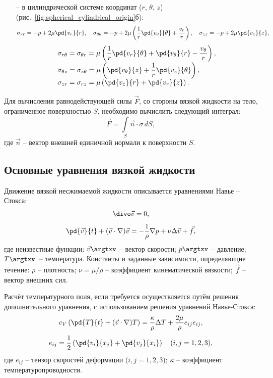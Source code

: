 \documentclass[a4paper, 14pt]{extarticle}
\begin{document}
\begin{itemize}
	\item[--] в цилиндрической системе координат ($r$, $\theta$, $z$) (рис.~\ref{fig:spherical_cylindrical_origin}б):
	\[
	\sigma_{rr} = -p + 2 \mu \pd{v_r}{r},\quad
	\sigma_{\theta\theta} = -p + 2\mu \left( \frac{1}{r} \pd{v_\theta}{\theta} +\frac{v_r}{r} \right),\quad
	\sigma_{zz} = -p + 2\mu \pd{v_z}{z},
	\]
	\[
	\begin{array}{l}
		\sigma_{r\theta} = \sigma_{\theta r} = \displaystyle \mu\left(
		\frac{1}{r} \pd{v_r}{\theta} + \pd{v_\theta}{r} - \frac{v_\theta}{r}
		\right), \\
		\sigma_{\theta z} =  \sigma_{z\theta}= \displaystyle \mu \left(
		 \pd{v_\theta}{z} + \frac{1}{r}\pd{v_z}{\theta} 
		\right),\\
		\sigma_{zr} =  \sigma_{rz}= \displaystyle \mu \left(
		\pd{v_z}{r} + \pd{v_r}{z}
		\right).
	\end{array}
	\]
\end{itemize}

Для вычисления равнодействующей силы $\vec{F}$, со стороны вязкой жидкости на тело, ограниченное поверхностью $S$, необходимо вычислить следующий интеграл:
\[
\vec{F} = \int\limits_S \vec{n} \cdot \sigma \, dS,
\]
где $\vec{n}$ -- вектор внешней единичной нормали к поверхности $S$.


\subsection{Основные уравнения вязкой жидкости}

Движение вязкой несжимаемой жидкости описывается \alert{уравнениями Навье -- Стокса}:
\begin{equation}
	\label{eq:navier–stokes_mass}
	\divo \vec{v} = 0,
\end{equation}
\begin{equation}
	\label{eq:navier–stokes}
	\pd{\vec{v}}{t} + (\vec{v}\cdot\nabla)\vec{v} = -\frac{1}{\rho}\nabla p + \nu \Delta \vec{v} + \vec{f},
\end{equation}
где \alert{неизвестные функции}: $\vec{v}\argtxv$ -- вектор скорости; $p\argtxv$ -- давление; $T\argtxv$~-- температура. \alert{Константы и заданные зависимости}, определяющие течение: $\rho$ -- плотность; $\nu=\mu/\rho$ -- коэффициент кинематической вязкости; $\vec{f}$ -- вектор внешних сил. 
		
Расчёт температурного поля, если требуется осуществляется путём решения дополнительного уравнения, с использованием решения уравнений Навье-Стокса:
\[
c_V\left(\pd{T}{t} + (\vec{v}\cdot\nabla)T \right) = \frac{\kappa}{\rho} \Delta T + \frac{2\mu}{\rho} e_{ij}e_{ij},
\]
\[
e_{ij} = \frac{1}{2}\left(
\pd{v_i}{x_j}+\pd{v_j}{x_i}
\right)\quad
(i,j = 1,2,3),
\]
где $e_{ij}$ -- тензор скоростей деформации ($i,j = 1,2,3$); $\kappa$ -- коэффициент температуропроводности.
\end{document}
